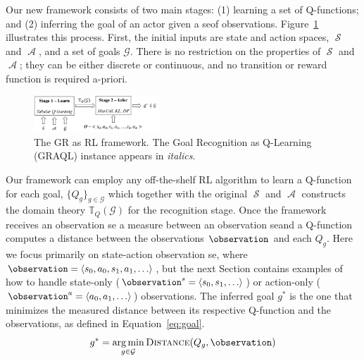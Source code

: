 \documentclass[letterpaper]{article} %
\DeclareMathOperator{\statespace}{\mathcal{S}}
\DeclareMathOperator{\actionspace}{\mathcal{A}}
\DeclareMathOperator*{\argmin}{arg\,min}
\providecommand\theory{\mathbb{T}}
\providecommand\goals{\mathcal{G}}
\begin{document}
Our new framework consists of two main stages: (1) learning a set of Q-functions; and (2) inferring the goal of an actor given a seof observations.
Figure~\ref{fig:RL4GR} illustrates this process.
First, the initial inputs are state and action spaces, $\statespace$ and $\actionspace$, and a set of goals $\goals$.
There is no restriction on the properties of $\statespace$ and $\actionspace$; they can be either discrete or continuous, and no transition or reward function is required a-priori. %
\begin{figure}[t]
    \centering
    \includegraphics[width=0.42\textwidth]{Figures/RL4GR.pdf}
    \caption{The GR as RL framework. The Goal Recognition as Q-Learning (GRAQL) instance appears in \textit{italics}.}
    \label{fig:RL4GR}
\end{figure}
Our framework can employ any off-the-shelf RL algorithm to learn a Q-function for each goal, $\{Q_g\}_{g \in \goals}$ which together with the original $\statespace$ and $\actionspace$ constructs the domain theory $\theory_{Q}(\goals)$ for the recognition stage.
Once the framework receives an observation se a measure between an observation seand a Q-function computes a distance between the observations $\observation$ and each $Q_g$.
Here we focus primarily on state-action observation se, where $\observation = \langle s_0, a_0, s_1, a_1, \ldots \rangle$, but the next Section contains examples of how to handle state-only ($\observation^s = \langle s_0, s_1,\ldots \rangle$) or action-only ($\observation^a = \langle a_0, a_1,\ldots \rangle$) observations.
The inferred goal $g^*$ is the one that minimizes the measured distance between its respective Q-function and the observations, as defined in Equation~\ref{eq:goal}.
\begin{equation}
\label{eq:goal}
    g^* = \argmin_{g \in \goals} {\textsc{Distance}(Q_g, \observation)}
\end{equation}
\end{document}
